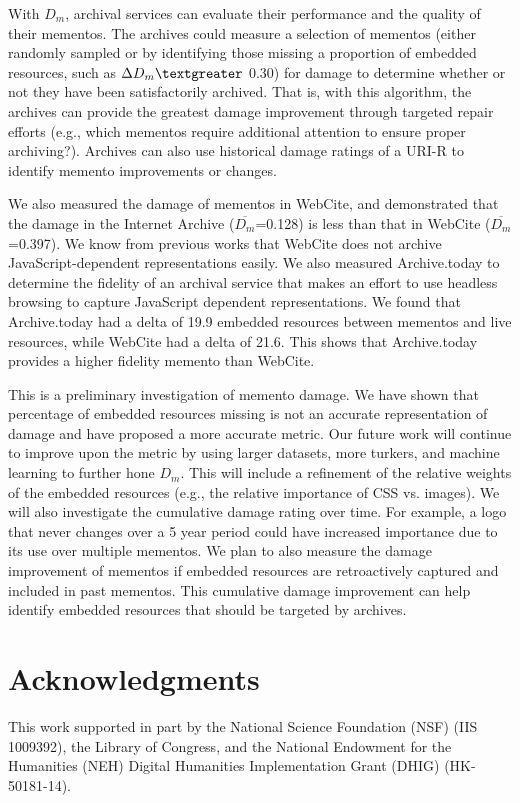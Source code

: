 With $D_m$, archival services can evaluate their performance and the quality of their mementos. The archives could measure a selection of mementos (either randomly sampled or by identifying those missing a proportion of embedded resources, such as {$\Delta D_m \textgreater$} 0.30) for damage to determine whether or not they have been satisfactorily archived. That is, with this algorithm, the archives can provide the greatest damage improvement through targeted repair efforts (e.g., which mementos require additional attention to ensure proper archiving?). Archives can also use historical damage ratings of a URI-R to identify memento improvements or changes.

We also measured the damage of mementos in WebCite, and demonstrated that the damage in the Internet Archive ($\overline{D_m}$=0.128) is less than that in WebCite ($\overline{D_m}$=0.397). We know from previous works that WebCite does not archive JavaScript-dependent representations easily. We also measured Archive.today to determine the fidelity of an archival service that makes an effort to use headless browsing to capture JavaScript dependent representations. We found that Archive.today had a delta of 19.9 embedded resources between mementos and live resources, while WebCite had a delta of 21.6. This shows that Archive.today provides a higher fidelity memento than WebCite.

This is a preliminary investigation of memento damage. We have shown that percentage of embedded resources missing is not an accurate representation of damage and have proposed a more accurate metric.  Our future work will continue to improve upon the metric by using larger datasets, more turkers, and machine learning to further hone $D_m$. This will include a refinement of the relative weights of the embedded resources (e.g., the relative importance of CSS vs. images). We will also investigate the cumulative damage rating over time. For example, a logo that never changes over a 5 year period could have increased importance due to its use over multiple mementos. We plan to also measure the damage improvement of mementos if embedded resources are retroactively captured and included in past mementos. This cumulative damage improvement can help identify embedded resources that should be targeted by archives.



\section{Acknowledgments}
This work supported in part by the National Science Foundation (NSF) (IIS 1009392), the Library of Congress, and the National Endowment for the Humanities (NEH) Digital Humanities Implementation Grant (DHIG) (HK-50181-14).


%

 
%  







